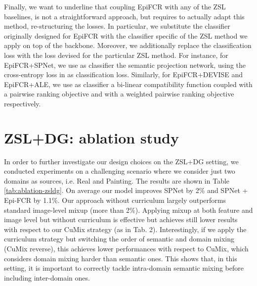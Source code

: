 \documentclass[runningheads]{llncs}
\begin{document}
Finally, we want to underline that coupling EpiFCR with any of the ZSL baselines, is not a straightforward approach, but requires to actually adapt this method, re-structuring the losses. In particular, we substitute the classifier originally designed for EpiFCR with the classifier specific of the ZSL method we apply on top of the backbone. Moreover, we additionally replace the classification loss with the loss devised for the particular ZSL method. For instance, for EpiFCR+SPNet, we use as classifier the semantic projection network, using the cross-entropy loss in \cite{xian2019semantic} as classification loss. Similarly, for EpiFCR+DEVISE and EpiFCR+ALE, we use as classifier a bi-linear compatibility function \cite{xian2018zeroshotgood} coupled with a pairwise ranking objective \cite{frome2013devise} and with a weighted pairwise ranking objective \cite{akata2013label} respectively. 
\section{ZSL+DG: ablation study}
In order to further investigate our design choices on the ZSL+DG setting, we conducted experiments on a challenging scenario where we consider just two domains as sources, i.e. Real and Painting. The results are shown in Table \ref{tab:ablation-zsldg}. On average our model improves SPNet by 2\% and SPNet + Epi-FCR by 1.1\%. Our approach without curriculum largely outperforms standard image-level mixup \cite{zhang2017mixup} (more than 2\%). Applying mixup at both feature and image level but without curriculum is effective but achieves still lower results with respect to our CuMix strategy (as in Tab. 2).  Interestingly, if we apply the curriculum strategy but switching the order of semantic and domain mixing (CuMix reverse), this achieves lower performances with respect to CuMix, which considers domain mixing harder than semantic ones. This shows that, in this setting, it is important to correctly tackle intra-domain semantic mixing before including inter-domain ones.
 
\end{document}
